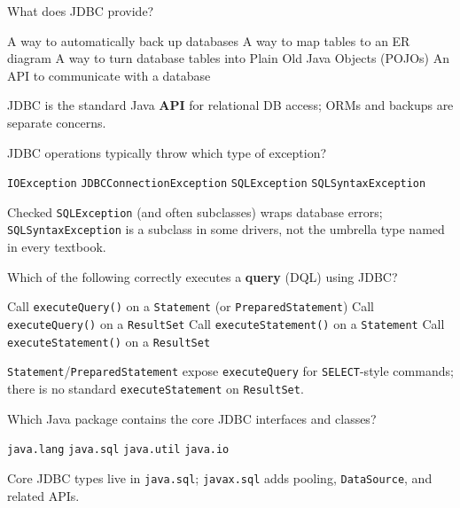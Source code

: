 \question[4]
What does JDBC provide?
\begin{choices}
  \choice A way to automatically back up databases
  \choice A way to map tables to an ER diagram
  \choice A way to turn database tables into Plain Old Java Objects (POJOs)
  \CorrectChoice An API to communicate with a database
\end{choices}
\begin{solution}
  JDBC is the standard Java \textbf{API} for relational DB access; ORMs and backups are separate concerns.
\end{solution}

\question[4]
JDBC operations typically throw which type of exception?
\begin{choices}
  \choice \texttt{IOException}
  \choice \texttt{JDBCConnectionException}
  \CorrectChoice \texttt{SQLException}
  \choice \texttt{SQLSyntaxException}
\end{choices}
\begin{solution}
  Checked \texttt{SQLException} (and often subclasses) wraps database errors; \texttt{SQLSyntaxException} is a subclass in some drivers, not the umbrella type named in every textbook.
\end{solution}

\question[4]
Which of the following correctly executes a \textbf{query} (DQL) using JDBC?
\begin{choices}
  \CorrectChoice Call \texttt{executeQuery()} on a \texttt{Statement} (or \texttt{PreparedStatement})
  \choice Call \texttt{executeQuery()} on a \texttt{ResultSet}
  \choice Call \texttt{executeStatement()} on a \texttt{Statement}
  \choice Call \texttt{executeStatement()} on a \texttt{ResultSet}
\end{choices}
\begin{solution}
  \texttt{Statement}/\texttt{PreparedStatement} expose \texttt{executeQuery} for \texttt{SELECT}-style commands; there is no standard \texttt{executeStatement} on \texttt{ResultSet}.
\end{solution}

\question[4]
Which Java package contains the core JDBC interfaces and classes?
\begin{choices}
  \choice \texttt{java.lang}
  \CorrectChoice \texttt{java.sql}
  \choice \texttt{java.util}
  \choice \texttt{java.io}
\end{choices}
\begin{solution}
  Core JDBC types live in \texttt{java.sql}; \texttt{javax.sql} adds pooling, \texttt{DataSource}, and related APIs.
\end{solution}

